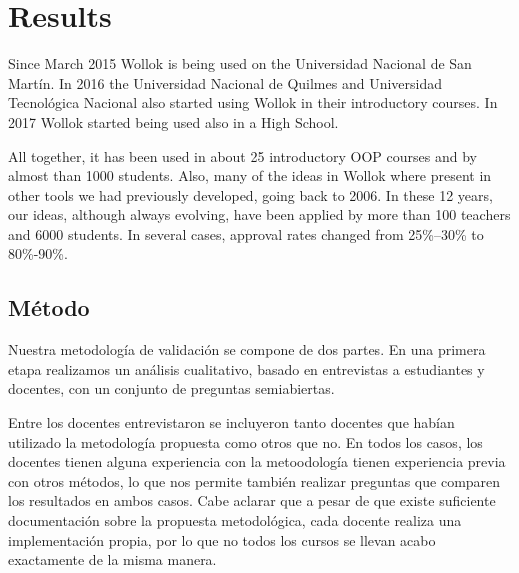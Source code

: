 \section{Results}
\label{sec:results}
Since March 2015 Wollok is being used on the Universidad Nacional de San Martín. 
In 2016 the Universidad Nacional de Quilmes and Universidad Tecnológica Nacional also started using Wollok in their introductory courses.
In 2017 Wollok started being used also in a High School. 

All together, it has been used in about 25 introductory OOP courses and by almost than 1000 students.
Also, many of the ideas in Wollok where present in other tools we had previously developed, going back to 2006. In these 12 years, our ideas, although always evolving, have been applied by more than 100 teachers and 6000 students. 
In several cases, approval rates changed from 25\%--30\% to 80\%-90\%.

\subsection*{Método}
Nuestra metodología de validación se compone de dos partes. 
En una primera etapa realizamos un análisis cualitativo, basado en entrevistas a estudiantes y docentes, con un conjunto de preguntas semiabiertas. 

Entre los docentes entrevistaron se incluyeron tanto docentes que habían utilizado la metodología propuesta como otros que no. En todos los casos, los docentes tienen alguna experiencia con la metoodología tienen experiencia previa con otros métodos, lo que nos permite también realizar preguntas que comparen los resultados en ambos casos.
Cabe aclarar que a pesar de que existe suficiente documentación sobre la propuesta metodológica, cada docente realiza una implementación propia, por lo que no todos los cursos se llevan acabo exactamente de la misma manera.

